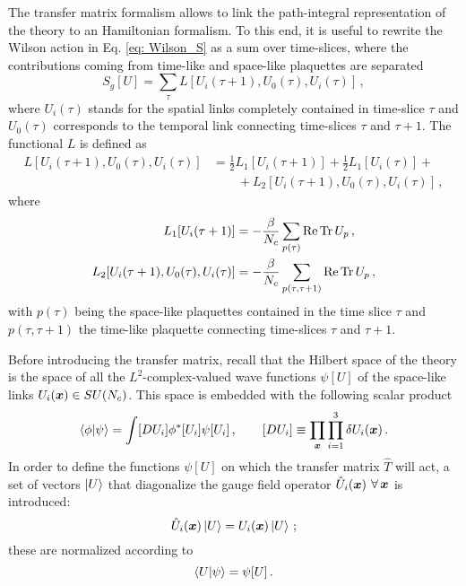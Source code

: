 \documentclass{article}
\begin{document}
The transfer matrix formalism allows to link the path-integral representation of the theory to an Hamiltonian formalism. To this end, it is useful to rewrite the Wilson action in Eq. \eqref{eq: Wilson_S} as a sum over time-slices, where the contributions coming from time-like and space-like plaquettes are separated \cite{Montvay:1994cy}
\begin{equation}
    S_g[U] = \sum_\tau L[U_i(\tau+1), U_0(\tau), U_i(\tau)] \, ,
\end{equation}
where $U_i(\tau)$ stands for the spatial links completely contained in time-slice $\tau$ and $U_0(\tau)$ corresponds to the temporal link connecting time-slices $\tau$ and $\tau+1$. The functional $L$ is defined as
\begin{equation}
    \begin{aligned}
        L[U_i(\tau+1), U_0(\tau), U_i(\tau)] &= \frac{1}{2} L_1[U_i(\tau+1)] + \frac{1}{2} L_1[U_i(\tau)] + \\
        &\qquad +L_2[U_i(\tau+1), U_0(\tau), U_i(\tau)] \, , 
    \end{aligned}
\end{equation}
where
\begin{align}
    L_1[U_i(\tau+1)] &= -\frac{\beta}{N_c} \sum_{p(\tau)} \Re \Tr U_p \, , \\
    L_2[U_i(\tau+1), U_0(\tau), U_i(\tau)] &= -\frac{\beta}{N_c} \sum_{p(\tau, \tau+1)} \Re \Tr U_p \, ,
\end{align}
with $p(\tau)$ being the space-like plaquettes contained in the time slice $\tau$ and $p(\tau, \tau+1)$ the time-like plaquette connecting time-slices $\tau$ and $\tau+1$. 

Before introducing the transfer matrix, recall that the Hilbert space of the theory is the space of all the $L^2$-complex-valued wave functions $\psi[U]$ of the space-like links $U_i(\vb*{x}) \in SU(N_c)$. This space is embedded with the following scalar product
\begin{equation}
    \braket{\phi}{\psi} = \int [D U_i] \phi^* [U_i] \psi[U_i] \, , \qquad [D U_i] \equiv \prod_{\vb*{x}} \prod_{i=1}^3 \delta U_i(\vb*{x}) \, .
\end{equation}
In order to define the functions $\psi[U]$ on which the transfer matrix $\hat{T}$ will act, a set of vectors $\ket{U}$ that diagonalize the gauge field operator $\hat{U}_i(\vb*{x})$ $\forall \, \vb*{x}$ is introduced:
\begin{equation}
    \hat{U}_i(\vb*{x}) \ket{U} = U_i(\vb*{x}) \ket{U} \, ;
\end{equation}
these are normalized according to
\begin{equation}
    \braket{U}{\psi} = \psi[U] \, .
\end{equation}




\printbibliography
\end{document}
